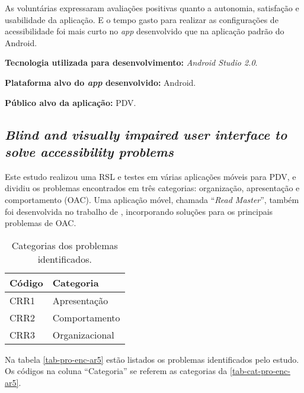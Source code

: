As voluntárias expressaram avaliações positivas quanto a autonomia, satisfação e usabilidade da aplicação.
E o tempo gasto para realizar as configurações de acessibilidade foi mais curto no \emph{app} desenvolvido que na aplicação padrão do Android.

\textbf{Tecnologia utilizada para desenvolvimento:} \emph{Android Studio 2.0}.

\textbf{Plataforma alvo do \emph{app} desenvolvido:} Android.

\textbf{Público alvo da aplicação:} PDV\@.

\subsection{\emph{Blind and visually impaired user interface to solve accessibility problems}}

Este estudo realizou uma RSL e testes em várias aplicações móveis para PDV, e dividiu os problemas encontrados em três categorias: organização, apresentação e comportamento (OAC).
Uma aplicação móvel, chamada ``\emph{Read Master}'', também foi desenvolvida no trabalho de , incorporando soluções para os principais problemas de OAC\@.

\begin{table}[htb]
    \begin{center}
        \ABNTEXfontereduzida
        \caption{Categorias dos problemas identificados.}
        \label{tab-cat-pro-enc-ar5}
        \begin{tabular}{p{2.0cm}|p{5.0cm}}
            \textbf{Código} & \textbf{Categoria} \\
            \hline
            CRR1            & Apresentação       \\
            \hline
            CRR2            & Comportamento      \\
            \hline
            CRR3            & Organizacional     \\
        \end{tabular}
    \end{center}
\end{table}

Na tabela \autoref{tab-pro-enc-ar5} estão listados os problemas identificados pelo estudo.
Os códigos na coluna ``Categoria'' se referem as categorias da \autoref{tab-cat-pro-enc-ar5}.

